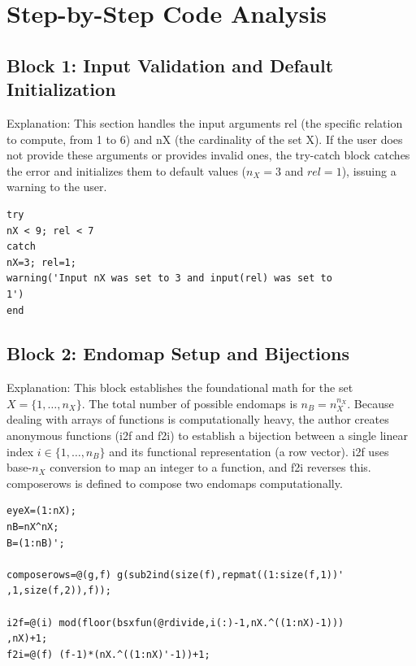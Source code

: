 \maketitle

\section*{Step-by-Step Code Analysis}

\subsection*{ \hspace*{0.2cm} Block 1: Input Validation and Default Initialization}
Explanation: This section handles the input arguments rel (the specific relation to compute, from 1 to 6) and nX (the cardinality of the set X). If the user does not provide these arguments or provides invalid ones, the try-catch block catches the error and initializes them to default values ($n_X = 3$ and $rel = 1$), issuing a warning to the user.

\begin{lstlisting}
try
nX < 9; rel < 7
catch
nX=3; rel=1; 
warning('Input nX was set to 3 and input(rel) was set to
1')
end
\end{lstlisting}


\subsection*{ \hspace*{0.2cm} Block 2: Endomap Setup and Bijections}
Explanation: This block establishes the foundational math for the set $X = \{1, \dots, n_X\}$. The total number of possible endomaps is $n_B = n_X^{n_X}$. Because dealing with arrays of functions is computationally heavy, the author creates anonymous functions (i2f and f2i) to establish a bijection between a single linear index $i \in \{1, \dots, n_B\}$ and its functional representation (a row vector). i2f uses base-$n_X$ conversion to map an integer to a function, and f2i reverses this. composerows is defined to compose two endomaps computationally.

\begin{lstlisting}
eyeX=(1:nX);  
nB=nX^nX;
B=(1:nB)';  

composerows=@(g,f) g(sub2ind(size(f),repmat((1:size(f,1))'
,1,size(f,2)),f));

i2f=@(i) mod(floor(bsxfun(@rdivide,i(:)-1,nX.^((1:nX)-1)))
,nX)+1; 
f2i=@(f) (f-1)*(nX.^((1:nX)'-1))+1;
\end{lstlisting}

